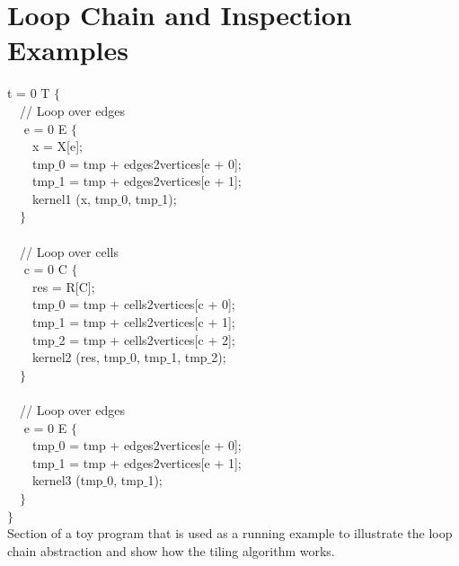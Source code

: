 \section{Loop Chain and Inspection Examples}


\begin{algorithm}[t]
\scriptsize\ttfamily
{}

 t = 0  T $\lbrace$\\
~~// Loop over edges\\
~~ e = 0  E $\lbrace$\\
~~~~x = X[e];\\
~~~~tmp$\_$0 = tmp + edges2vertices[e + 0];\\
~~~~tmp$\_$1 = tmp + edges2vertices[e + 1]; \\
~~~~kernel1 (x, tmp$\_0$, tmp$\_$1);\\
~~$\rbrace$\\
~\\
~~// Loop over cells\\
~~ c = 0  C $\lbrace$\\
~~~~res = R[C];\\
~~~~tmp$\_$0 = tmp + cells2vertices[c + 0];\\
~~~~tmp$\_$1 = tmp + cells2vertices[c + 1];\\
~~~~tmp$\_$2 = tmp + cells2vertices[c + 2];\\
~~~~kernel2 (res, tmp$\_0$, tmp$\_$1, tmp$\_$2);\\
~~$\rbrace$\\
~\\
~~// Loop over edges\\
~~ e = 0  E $\lbrace$\\
~~~~tmp$\_$0 = tmp + edges2vertices[e + 0];\\
~~~~tmp$\_$1 = tmp + edges2vertices[e + 1]; \\
~~~~kernel3 (tmp$\_0$, tmp$\_$1);\\
~~$\rbrace$\\
$\rbrace$\\

\caption{Section of a toy program that is used as a running example to illustrate the loop chain abstraction and show how the tiling algorithm works.}
\label{code:tiling-runningexample}
\end{algorithm}



